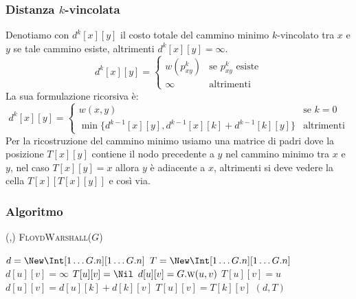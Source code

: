         \subsubsection{Distanza $k$-vincolata}
            Denotiamo con $d^k[x][y]$ il costo totale del cammino minimo $k$-vincolato tra $x$ e $y$ se tale cammino esiste, altrimenti $d^k[x][y]=\infty$.
            $$
                d^k[x][y]=\begin{cases}
                    w(p^k_{xy}) & \text{se } p^k_{xy} \text{ esiste}\\
                    \infty & \text{altrimenti}
                \end{cases}
            $$
            La sua formulazione ricorsiva è:
            $$
                d^k[x][y]=\begin{cases}
                    w(x,y) & \text{se } k=0\\
                    \min\{d^{k-1}[x][y],d^{k-1}[x][k]+d^{k-1}[k][y]\} & \text{altrimenti}
                \end{cases}
            $$
            Per la ricostruzione del cammino minimo usiamo una matrice di padri dove la posizione $T[x][y]$ contiene il nodo precedente a $y$ nel cammino minimo tra $x$ e $y$, nel caso $T[x][y]=x$ allora $y$ è adiacente a $x$, altrimenti si deve vedere la cella $T[x][T[x][y]]$ e così via.
        \subsubsection{Algoritmo}
            \begin{algorithm}[H]
                \caption{(\Int[][],\Int[][]) \textsc{FloydWarshall}(\Graph $G$)}
                \begin{algorithmic}
                    \State \Int[][] $d = \New \Int[1\dots G.n][1\dots G.n]$
                    \State \Int[][] $T = \New \Int[1\dots G.n][1\dots G.n]$
                        \State $d[u][v]=\infty$
                        \State $T[u][v]=\Nil$
                    \EndFor
                            \State $d[u][v]=G.\Call{w}{u,v}$
                            \State $T[u][v]=u$
                        \EndFor
                    \EndFor
                                    \State $d[u][v]=d[u][k]+d[k][v]$
                                    \State $T[u][v]=T[k][v]$
                                \EndIf
                            \EndFor
                        \EndFor
                    \EndFor
                    \State \Return $(d,T)$
                \end{algorithmic}
            \end{algorithm}
